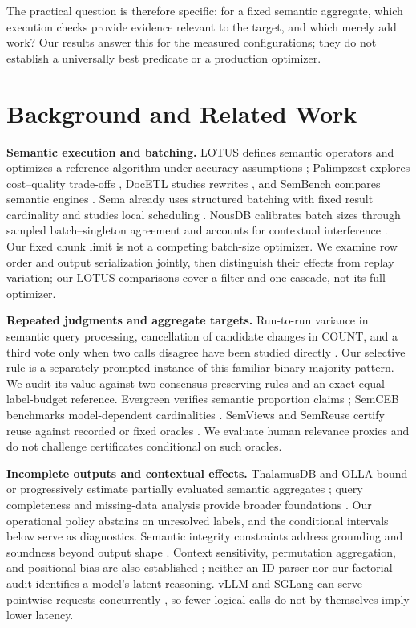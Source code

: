 \documentclass[conference]{IEEEtran}
\begin{document}
The practical question is therefore specific: for a fixed semantic aggregate, which execution checks provide evidence relevant to the target, and which merely add work? Our results answer this for the measured configurations; they do not establish a universally best predicate or a production optimizer.

\section{Background and Related Work}
\textbf{Semantic execution and batching.} LOTUS defines semantic operators and optimizes a reference algorithm under accuracy assumptions \cite{lotus}; Palimpzest explores cost--quality trade-offs \cite{palimpzest}, DocETL studies rewrites \cite{docetl}, and SemBench compares semantic engines \cite{sembench}. Sema already uses structured batching with fixed result cardinality and studies local scheduling \cite{sema}. NousDB calibrates batch sizes through sampled batch--singleton agreement and accounts for contextual interference \cite{nousdb}. Our fixed chunk limit is not a competing batch-size optimizer. We examine row order and output serialization jointly, then distinguish their effects from replay variation; our LOTUS comparisons cover a filter and one cascade, not its full optimizer.

\textbf{Repeated judgments and aggregate targets.} Run-to-run variance in semantic query processing, cancellation of candidate changes in COUNT, and a third vote only when two calls disagree have been studied directly \cite{runvariance}. Our selective rule is a separately prompted instance of this familiar binary majority pattern. We audit its value against two consensus-preserving rules and an exact equal-label-budget reference. Evergreen verifies semantic proportion claims \cite{evergreen}; SemCEB benchmarks model-dependent cardinalities \cite{semceb}. SemViews and SemReuse certify reuse against recorded or fixed oracles \cite{semviews,semreuse}. We evaluate human relevance proxies and do not challenge certificates conditional on such oracles.

\textbf{Incomplete outputs and contextual effects.} ThalamusDB and OLLA bound or progressively estimate partially evaluated semantic aggregates \cite{thalamus,olla}; query completeness and missing-data analysis provide broader foundations \cite{query_completeness,contingency}. Our operational policy abstains on unresolved labels, and the conditional intervals below serve as diagnostics. Semantic integrity constraints address grounding and soundness beyond output shape \cite{constraints}. Context sensitivity, permutation aggregation, and positional bias are also established \cite{lostmiddle,permcons,outputorder}; neither an ID parser nor our factorial audit identifies a model's latent reasoning. vLLM and SGLang can serve pointwise requests concurrently \cite{vllm,sglang}, so fewer logical calls do not by themselves imply lower latency.
\end{document}
